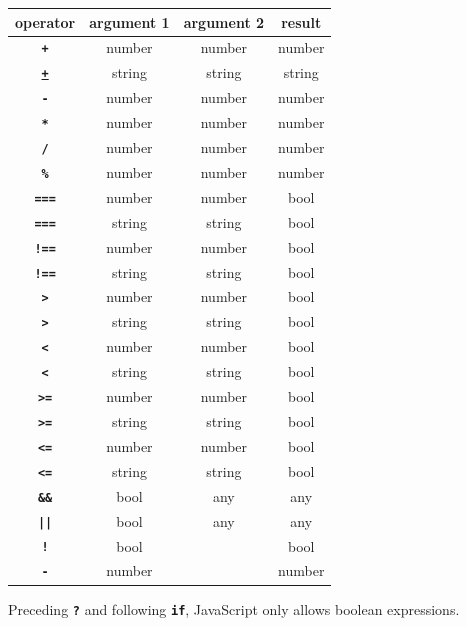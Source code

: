 \begin{center}
\begin{tabular}{c|c|c|c}
operator & argument 1 & argument 2 & result\\ \hline
\texttt{\textbf{+}} & number   & number     & number\\
\texttt{\href{https://sourceacademy.org/sicpjs/3.3.4\#p24}{\textbf{+}}} & string   & string     & string\\
\texttt{\textbf{-}} & number   & number     & number\\
\texttt{\textbf{*}} & number   & number     & number\\
\texttt{\textbf{/}} & number   & number     & number\\
\texttt{\textbf{\%}} & number   & number     & number\\
\texttt{\textbf{===}} & number   & number     & bool\\
\texttt{\textbf{===}} & string   & string     & bool\\
\texttt{\textbf{!==}} & number   & number     & bool\\
\texttt{\textbf{!==}} & string   & string     & bool\\
\texttt{\textbf{>}} & number   & number     & bool\\
\texttt{\textbf{>}} & string   & string     & bool\\
\texttt{\textbf{<}} & number   & number     & bool\\
\texttt{\textbf{<}} & string   & string     & bool\\
\texttt{\textbf{>=}} & number   & number     & bool\\
\texttt{\textbf{>=}} & string   & string     & bool\\
\texttt{\textbf{<=}}    & number   & number     & bool\\
\texttt{\textbf{<=}} & string   & string     & bool\\
\texttt{\textbf{\&\&}} & bool & any & any\\
\texttt{\textbf{||}}   & bool & any & any\\
\texttt{\textbf{!}}    & bool &      & bool\\
\texttt{\textbf{-}}    & number &    & number
\end{tabular}
\end{center}

Preceding \texttt{\textbf{?}} and following \texttt{\textbf{if}}, JavaScript only allows
boolean expressions.
